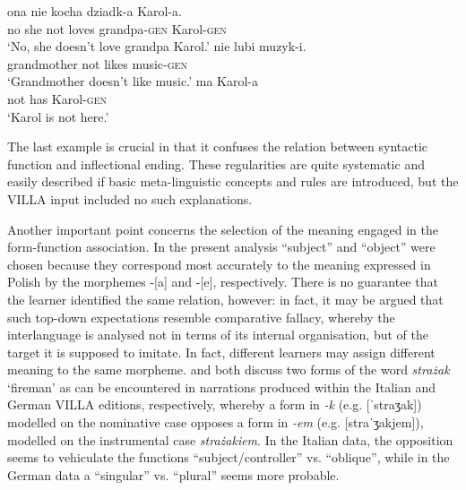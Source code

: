 \ea%
    \label{ex:08:6}
    \ea\label{ex:08:6a}
       {ona}   {nie}   {kocha}   {dziadk-a}   {Karol-a.} \\
            no  she  not  loves  grandpa-\textsc{gen}  Karol-\textsc{gen} \\
    \glt    ‘No, she doesn't love grandpa Karol.’
    \ex\label{ex:08:6b}
       {nie}   {lubi}   {muzyk-i.}\\
            grandmother  not  likes  music-\textsc{gen}\\
    \glt    ‘Grandmother doesn't like music.’
    \ex\label{ex:08:6c}
      {ma}  {Karol-a}\\
            not  has  Karol-\textsc{gen}\\
    \glt    ‘Karol is not here.’
    \z
\z

The last example is crucial in that it confuses the relation between syntactic function and inflectional ending. These regularities are quite systematic and easily described if basic meta-linguistic concepts and rules are introduced, but the VILLA input included no such explanations. 

Another important point concerns the selection of the meaning engaged in the form-function association. In the present analysis “subject” and “object” were chosen because they correspond most accurately to the meaning expressed in Polish by the morphemes -[a] and -[e], respectively. There is no guarantee that the learner identified the same relation, however: in fact, it may be argued that such top-down expectations resemble  comparative fallacy, whereby the interlanguage is analysed not in terms of its internal organisation, but of the target it is supposed to imitate. In fact, different learners may assign different meaning to the same morpheme. \citet{Bernini2018a} and \citet[28-33]{Dimroth2018} both discuss two forms of the word \textit{strażak} ‘fireman’ as can be encountered in narrations produced within the Italian and German VILLA editions, respectively, whereby a form in \textit{{}-k} (e.g. [ˈstraʒak]) modelled on the nominative case opposes a form in \textit{{}-em} (e.g. [straˈʒakjem]), modelled on the instrumental case \textit{strażakiem}. In the Italian data, the opposition seems to vehiculate the functions “subject/controller” vs. “oblique”, while in the German data a “singular” vs. “plural” seems more probable.

